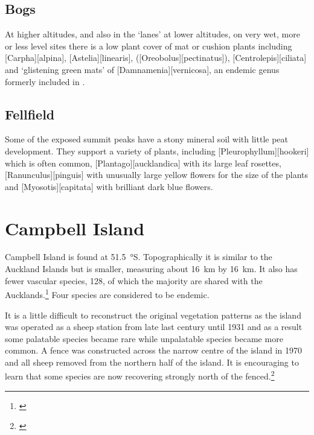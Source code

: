 \subsection{Bogs}

At higher altitudes, and also in the `lanes' at lower altitudes, on very wet, more or less level sites there is a low plant cover of mat or cushion plants including [Carpha][alpina], [Astelia][linearis],  ([Oreobolus][pectinatus]), [Centrolepis][ciliata] and `glistening green mats' of [Damnamenia][vernicosa], an endemic genus formerly included in .

\subsection{Fellfield}

Some of the exposed summit peaks have a stony mineral soil with little peat development.
They support a variety of plants, including [Pleurophyllum][hookeri] which is often common, [Plantago][aucklandica] with its large leaf rosettes, [Ranunculus][pinguis] with unusually large yellow flowers for the size of the plants and [Myosotis][capitata] with brilliant dark blue flowers.

\section{Campbell Island}

Campbell Island is found at \SI{51.5}{\degree}S.
Topographically it is similar to the Auckland Islands but is smaller, measuring about \SI{16}{\kilo\metre} by \SI{16}{\kilo\metre}.
It also has fewer vascular species, 128, of which the majority are shared with the Aucklands.\footnote{\cite{oliver1951botanical}}
Four species are considered to be endemic.

It is a little difficult to reconstruct the original vegetation patterns as the island was operated as a sheep station from late last century until 1931 and as a result some palatable species became rare while unpalatable species became more common.
A fence was constructed across the narrow centre of the island in 1970 and all sheep removed from the northern half of the island.
It is encouraging to learn that some species are now recovering strongly north of the fenced.\footnote{\cite{meurk1982regeneration}}

